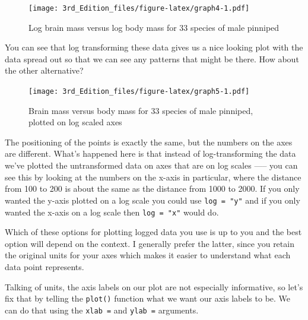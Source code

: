\documentclass[
]{book}
\newenvironment{Shaded}{\begin{snugshade}}{\end{snugshade}}
\newcommand{\DataTypeTok}[1]{\textcolor[rgb]{0.13,0.29,0.53}{#1}}
\newcommand{\KeywordTok}[1]{\textcolor[rgb]{0.13,0.29,0.53}{\textbf{#1}}}
\newcommand{\NormalTok}[1]{#1}
\newcommand{\OperatorTok}[1]{\textcolor[rgb]{0.81,0.36,0.00}{\textbf{#1}}}
\newcommand{\StringTok}[1]{\textcolor[rgb]{0.31,0.60,0.02}{#1}}
\begin{document}
\begin{figure}
\centering
\texttt{[image: 3rd\_Edition\_files/figure-latex/graph4-1.pdf]}
\caption{\label{fig:graph4}Log brain mass versus log body mass for 33 species of male pinniped}
\end{figure}

You can see that log transforming these data gives us a nice looking plot with the data spread out so that we can see any patterns that might be there. How about the other alternative?

\begin{Shaded}
\end{Shaded}

\begin{figure}
\centering
\texttt{[image: 3rd\_Edition\_files/figure-latex/graph5-1.pdf]}
\caption{\label{fig:graph5}Brain mass versus body mass for 33 species of male pinniped, plotted on log scaled axes}
\end{figure}

The positioning of the points is exactly the same, but the numbers on the axes are different. What's happened here is that instead of log-transforming the data we've plotted the untransformed data on axes that are on log scales ----- you can see this by looking at the numbers on the x-axis in particular, where the distance from 100 to 200 is about the same as the distance from 1000 to 2000. If you only wanted the y-axis plotted on a log scale you could use \texttt{log\ =\ "y"} and if you only wanted the x-axis on a log scale then \texttt{log\ =\ "x"} would do.

Which of these options for plotting logged data you use is up to you and the best option will depend on the context. I generally prefer the latter, since you retain the original units for your axes which makes it easier to understand what each data point represents.

Talking of units, the axis labels on our plot are not especially informative, so let's fix that by telling the \texttt{plot()} function what we want our axis labels to be. We can do that using the \texttt{xlab\ =} and \texttt{ylab\ =} arguments.

\begin{Shaded}
\end{Shaded}
\end{document}
